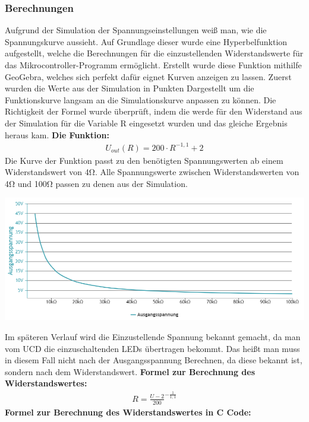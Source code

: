 \documentclass[paper=a4, 12pt]{scrreprt}
\begin{document}
			\subsubsection{Berechnungen}
			\label{sec:berechnungen}
			Aufgrund der Simulation der Spannungseinstellungen weiß man, wie die Spannungskurve aussieht. Auf Grundlage dieser wurde eine Hyperbelfunktion aufgestellt, welche die Berechnungen für die einzustellenden Widerstandswerte für das Mikrocontroller-Programm ermöglicht. \hfill \break
			Erstellt wurde diese Funktion mithilfe GeoGebra, welches sich perfekt dafür eignet Kurven anzeigen zu lassen. Zuerst wurden die Werte aus der Simulation in Punkten Dargestellt um die Funktionskurve langsam an die Simulationskurve anpassen zu können. \hfill \break
			Die Richtigkeit der Formel wurde überprüft, indem die werde für den Widerstand aus der Simulation für die Variable R eingesetzt wurden und das gleiche Ergebnis heraus kam. \hfill \break \hfill \break
			\textbf{Die Funktion:} 
			\begin{align*} 
			U_{out}(R) = 200 \cdot R^{-1,1} + 2
			\end{align*}
			Die Kurve der Funktion passt zu den benötigten Spannungswerten ab einem Widerstandswert von 4Ω. Alle Spannungswerte zwischen Widerstandswerten von 4Ω und 100Ω passen zu denen aus der Simulation.
			\begin{adjustbox}{center,caption={Berechneter Spannungsverlauf bei Widerstandsänderung},label={fig:berechnungSPG},nofloat=figure,vspace=\bigskipamount}
				\includegraphics[width=\textwidth]{img/berechnungSPG.PNG}
			\end{adjustbox}
			Im späteren Verlauf wird die Einzustellende Spannung bekannt gemacht, da man vom UCD die einzuschaltenden LEDs übertragen bekommt. Das heißt man muss in diesem Fall nicht nach der Ausgangsspannung Berechnen, da diese bekannt ist, sondern nach dem Widerstandswert. \hfill \break \hfill \break
			\textbf{Formel zur Berechnung des Widerstandswertes:}
			\begin{align*} 
			R=\frac{ U - 2 }{ 200 }^{ -\frac{ 1 }{ 1,1 } }
			\end{align*}
			\textbf{Formel zur Berechnung des Widerstandswertes in C Code:}
			
			\pagebreak
			 
\end{document}
